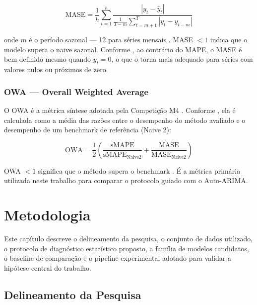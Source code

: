 \documentclass[
  12pt,
  openright,
  twoside,
  a4paper,
  english,
  brazil
]{abntex2}
\begin{document}
\begin{equation}
  \text{MASE} = \frac{1}{h} \sum_{t=1}^{h} \frac{|y_t - \hat{y}_t|}{\frac{1}{T - m} \sum_{t=m+1}^{T} |y_t - y_{t-m}|}
  \label{eq:mase}
\end{equation}

onde $m$ é o período sazonal — 12 para séries mensais \cite{hyndman2006another}. MASE $< 1$ indica que o modelo supera o naive sazonal. Conforme , ao contrário do MAPE, o MASE é bem definido mesmo quando $y_t = 0$, o que o torna mais adequado para séries com valores nulos ou próximos de zero.

\subsection{OWA — Overall Weighted Average}
\label{subsec:owa}

O OWA é a métrica síntese adotada pela Competição M4 \cite{makridakis2018m4results}. Conforme , ela é calculada como a média das razões entre o desempenho do método avaliado e o desempenho de um benchmark de referência (Naive 2):

\begin{equation}
  \text{OWA} = \frac{1}{2}\left(\frac{\text{sMAPE}}{\text{sMAPE}_{\text{Naive2}}} + \frac{\text{MASE}}{\text{MASE}_{\text{Naive2}}}\right)
  \label{eq:owa}
\end{equation}

OWA $< 1$ significa que o método supera o benchmark \cite{makridakis2018m4results}. É a métrica primária utilizada neste trabalho para comparar o protocolo guiado com o Auto-ARIMA.

\chapter{Metodologia}
\label{cap:metodologia}

Este capítulo descreve o delineamento da pesquisa, o conjunto de dados utilizado, o protocolo de diagnóstico estatístico proposto, a família de modelos candidatos, o baseline de comparação e o pipeline experimental adotado para validar a hipótese central do trabalho.

\section{Delineamento da Pesquisa}
\label{sec:delineamento}
\end{document}

